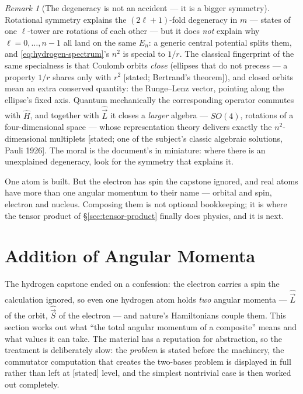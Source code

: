\documentclass[11pt]{article}
\theoremstyle{plain}
\theoremstyle{definition}
\theoremstyle{remark}
\newtheorem{remark}[theorem]{Remark}
\newcommand{\op}[1]{\hat{#1}}
\begin{document}
\begin{remark}[The degeneracy is not an accident --- it is a bigger
symmetry]\label{rem:runge-lenz}
Rotational symmetry explains the $(2\ell + 1)$-fold degeneracy in
$m$ --- states of one $\ell$-tower are rotations of each other ---
but it does \emph{not} explain why $\ell = 0, \dots, n{-}1$ all
land on the same $E_n$: a generic central potential splits them,
and \eqref{eq:hydrogen-spectrum}'s $n^2$ is special to $1/r$. The
classical fingerprint of the same specialness is that Coulomb
orbits \emph{close} (ellipses that do not precess --- a property
$1/r$ shares only with $r^2$ [stated; Bertrand's theorem]), and
closed orbits mean an extra conserved quantity: the Runge--Lenz
vector, pointing along the ellipse's fixed axis. Quantum
mechanically the corresponding operator commutes with $\op H$, and
together with $\op{\vec L}$ it closes a \emph{larger} algebra ---
$SO(4)$, rotations of a four-dimensional space --- whose
representation theory delivers exactly the $n^2$-dimensional
multiplets [stated; one of the subject's classic algebraic
solutions, Pauli 1926]. The moral is the document's in miniature:
where there is an unexplained degeneracy, look for the symmetry
that explains it.
\end{remark}

\medskip
\noindent
One atom is built. But the electron has spin the capstone ignored,
and real atoms have more than one angular momentum to their name
--- orbital and spin, electron and nucleus. Composing them is not
optional bookkeeping; it is where the tensor product of
\S\ref{sec:tensor-product} finally does physics, and it is next.


\section{Addition of Angular Momenta}
\label{sec:addition}

The hydrogen capstone ended on a confession: the electron carries a
spin the calculation ignored, so even one hydrogen atom holds
\emph{two} angular momenta --- $\op{\vec L}$ of the orbit,
$\op{\vec S}$ of the electron --- and nature's Hamiltonians couple
them. This section works out what ``the total angular momentum of a
composite'' means and what values it can take. The material has a
reputation for abstraction, so the treatment is deliberately slow:
the \emph{problem} is stated before the machinery, the commutator
computation that creates the two-bases problem is displayed in full
rather than left at [stated] level, and
the simplest nontrivial case is then worked out completely.
\end{document}
